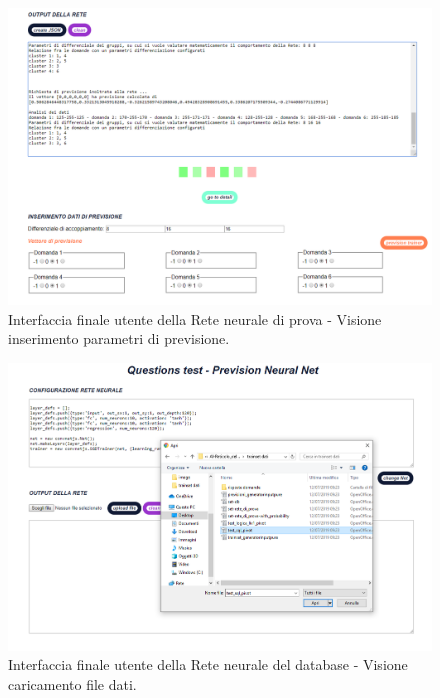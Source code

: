 \begin{figure}[H]
\centering
	\includegraphics[width=1\linewidth]{./image/Rete-di-prova_finale3.png}
	\caption{Interfaccia finale utente della Rete neurale di prova - Visione inserimento parametri di previsione.}
	\label{Interfaccia finale utente della Rete neurale di prova - 3.}
\end{figure}

\noindent

\begin{figure}[H]
\centering
	\includegraphics[width=1\linewidth]{./image/Rete-di-prova_db.png}
	\caption{Interfaccia finale utente della Rete neurale del database - Visione caricamento file dati.}
	\label{Interfaccia finale utente della Rete neurale del database -1.}
\end{figure}
\noindent


